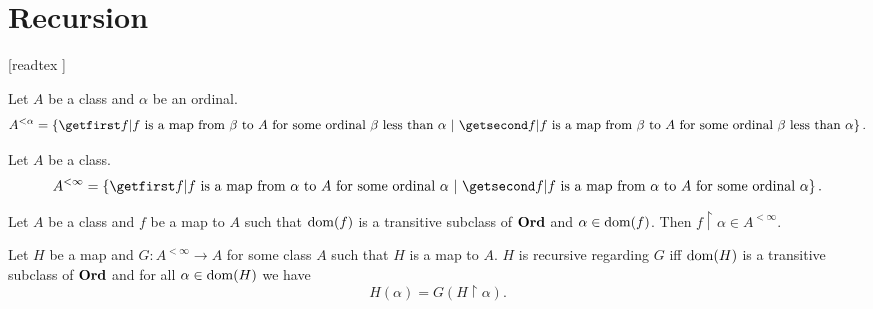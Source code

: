 \documentclass[../../set-theory/set-theory.tex]{subfiles}
\begin{document}
  \chapter{Recursion}\label{chapter:recursion}


  \begin{forthel}

    [readtex ]

  \end{forthel}


  \begin{forthel}
    \begin{definition}
      Let $A$ be a class and $\alpha$ be an ordinal.
      \[ A^{< \alpha} = \class{f | \text{$f$ is a map from $\beta$ to $A$
      for some ordinal $\beta$ less than $\alpha$}}. \]
    \end{definition}
  \end{forthel}

  \begin{forthel}
    \begin{definition}
      Let $A$ be a class.
      \[ A^{< \infty} = \class{f | \text{$f$ is a map from $\alpha$ to $A$
      for some ordinal $\alpha$}}. \]
    \end{definition}
  \end{forthel}

  \begin{forthel}
    \begin{lemma}
      Let $A$ be a class and $f$ be a map to $A$ such that $\operatorname{dom}(f)$ is a
      transitive subclass of $\mathbf{Ord}$ and $\alpha \in \operatorname{dom}(f)$.
      Then $f \restriction \alpha \in A^{< \infty}$.
    \end{lemma}
  \end{forthel}

  \begin{forthel}
    \begin{definition}
      Let $H$ be a map and $G : A^{< \infty} \to A$ for some class $A$ such
      that $H$ is a map to $A$.
      $H$ is recursive regarding $G$ iff $\operatorname{dom}(H)$ is a transitive subclass of
      $\mathbf{Ord}$ and for all $\alpha \in \operatorname{dom}(H)$ we have
      \[ H(\alpha) = G(H \restriction \alpha). \]
    \end{definition}
  \end{forthel}
\end{document}
